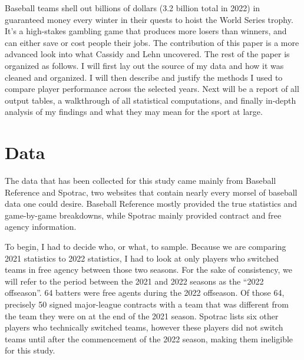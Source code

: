 \documentclass[10pt]{article}
\begin{document}
Baseball teams shell out billions of dollars (3.2 billion total in 2022) in guaranteed money every winter in their quests to 
hoist the World Series trophy. It’s a high-stakes gambling game that produces more losers than winners, and can either save or 
cost people their jobs. The contribution of this paper is a more advanced look into what Cassidy and Lehn uncovered. The rest 
of the paper is organized as follows. I will first lay out the source of my data and how it was cleaned and organized. I will 
then describe and justify the methods I used to compare player performance across the selected years. Next will be a 
report of all output tables, a walkthrough of all statistical computations, and finally in-depth analysis of my findings 
and what they may mean for the sport at large. 

\section{Data}

The data that has been collected for this study came mainly from Baseball Reference and Spotrac, two websites that contain 
nearly every morsel of baseball data one could desire. Baseball Reference mostly provided the true statistics and game-by-game 
breakdowns, while Spotrac mainly provided contract and free agency information. 

To begin, I had to decide who, or what, to sample. Because we are comparing 2021 statistics to 2022 statistics, I had to look 
at only players who switched teams in free agency between those two seasons. For the sake of consistency, we will refer to the 
period between the 2021 and 2022 seasons as the “2022 offseason”. 64 batters were free agents during the 2022 
offseason. Of those 64, precisely 50 signed major-league contracts with a team that was different from the team they were on 
at the end of the 2021 season. Spotrac lists six other players who technically switched teams, however these players did not 
switch teams until after the commencement of the 2022 season, making them ineligible for this study.
\end{document}
